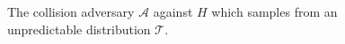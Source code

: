 \begin{figure}[t]
\begin{algorithm}[H]
    \caption{\label{alg.collision-adversary-unpred-crs} The collision adversary $\mathcal{A}$ against $H$ which samples from an unpredictable distribution $\mathcal{T}$.}
    \begin{algorithmic}[1]
            \State{}
        \EndFunction
    \end{algorithmic}
\end{algorithm}
\end{figure}
